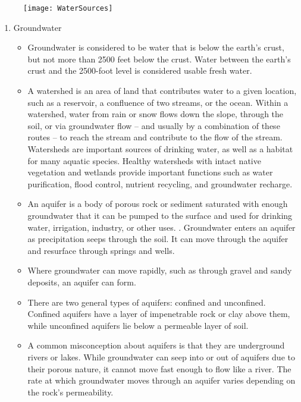 \begin{itemize}
\begin{figure}
\begin{center}
\texttt{[image: WaterSources]}\\
\end{center}
\end{figure}
\begin{enumerate}
\item Groundwater
\begin{itemize}
\item Groundwater is considered to be water that is below the earth’s crust, but not more than 2500 feet below the crust. Water between the earth’s crust and the 2500-foot level is considered usable fresh water.\\

\item A watershed is an area of land that contributes water to a given location, such as a reservoir, a confluence of two streams, or the ocean. Within a watershed, water from rain or snow flows down the slope, through the soil, or via groundwater flow – and usually by a combination of these routes – to reach the stream and contribute to the flow of the stream. Watersheds are
important sources of drinking water, as well as a habitat for many aquatic species. Healthy watersheds with intact native vegetation and wetlands provide important functions such as water purification, flood control, nutrient recycling, and groundwater recharge.

\item An aquifer is a body of porous rock or sediment saturated with enough groundwater that it can be pumped to the surface and used for drinking water, irrigation, industry, or other uses. . Groundwater enters an aquifer as precipitation seeps through the soil. It can move through the aquifer and resurface through springs and wells.

\item Where groundwater can move rapidly, such as through gravel and sandy
deposits, an aquifer can form.  

\item There are two general types of aquifers: confined and unconfined. Confined aquifers have a layer of impenetrable rock or clay above them, while unconfined aquifers lie below a permeable layer of soil.

\item A common misconception about aquifers is that they are underground rivers or lakes. While groundwater can seep into or out of aquifers due to their porous nature, it cannot move fast enough to flow like a river. The rate at which groundwater moves through an aquifer varies depending on the rock’s permeability.


\end{itemize}
\end{enumerate}
\end{itemize}
